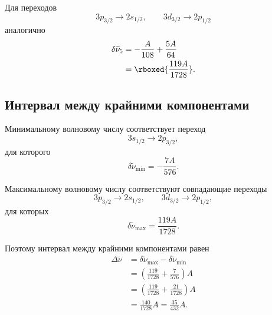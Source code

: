 \documentclass[../final.tex]{subfiles}
\begin{document}

Для переходов
%
\begin{equation*}
    3p_{3/2}\rightarrow2s_{1/2},
    \qquad
    3d_{3/2}\rightarrow2p_{1/2}
\end{equation*}
%
аналогично
%
\begin{align*}
    \delta\widetilde{\nu}_5
    &=
    -\frac{A}{108}
    +
    \frac{5A}{64}
    \\
    &=
    \rboxed{
        \frac{119A}{1728}
    }.
\end{align*}



\subsection*{Интервал между крайними компонентами}

Минимальному волновому числу соответствует переход
%
\begin{equation*}
    3s_{1/2}
    \rightarrow
    2p_{3/2},
\end{equation*}
%
для которого
%
\begin{equation*}
    \delta\widetilde{\nu}_{\min}
    =
    -\frac{7A}{576}.
\end{equation*}

Максимальному волновому числу соответствуют совпадающие переходы
%
\begin{equation*}
    3p_{3/2}
    \rightarrow
    2s_{1/2},
    \qquad
    3d_{3/2}
    \rightarrow
    2p_{1/2},
\end{equation*}
%
для которых
%
\begin{equation*}
    \delta\widetilde{\nu}_{\max}
    =
    \frac{119A}{1728}.
\end{equation*}

Поэтому интервал между крайними компонентами равен
%
\begin{align*}
    \Delta\widetilde{\nu}
    &=
    \delta\widetilde{\nu}_{\max}
    -
    \delta\widetilde{\nu}_{\min}
    \\
    &=
    \left(
        \frac{119}{1728}
        +
        \frac{7}{576}
    \right)A
    \\
    &=
    \left(
        \frac{119}{1728}
        +
        \frac{21}{1728}
    \right)A
    \\
    &=
    \frac{140}{1728}A
    =
    \frac{35}{432}A.
\end{align*}
\end{document}
